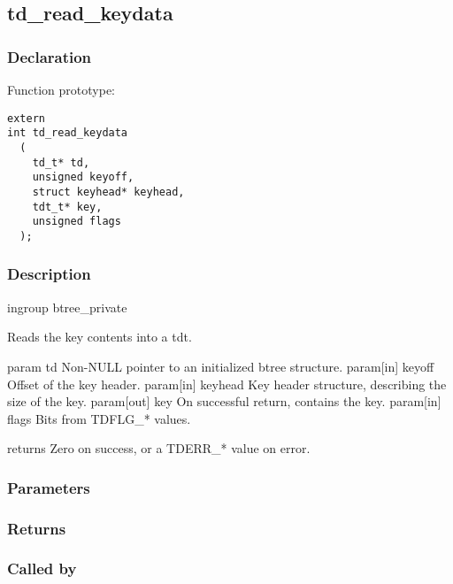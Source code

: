 
\newpage
\subsection{td\_read\_keydata}
\subsubsection{Declaration} Function prototype:

\begin{verbatim}
extern
int td_read_keydata
  (
    td_t* td,
    unsigned keyoff,
    struct keyhead* keyhead,
    tdt_t* key,
    unsigned flags
  );
\end{verbatim}

\subsubsection{Description}


 ingroup btree\_private

 Reads the key contents into a tdt.

 param td Non-NULL pointer to an initialized btree structure.
 param[in] keyoff Offset of the key header.
 param[in] keyhead Key header structure, describing the size of the key.
 param[out] key On successful return, contains the key.
 param[in] flags Bits from TDFLG\_* values.

 returns Zero on success, or a TDERR\_* value on error.
 

\subsubsection{Parameters}
\subsubsection{Returns}
\subsubsection{Called by}
